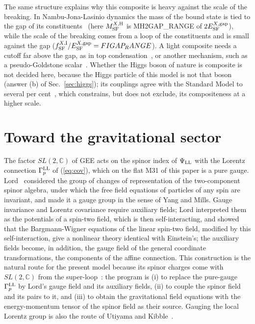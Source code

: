 \documentclass[aps,prd,twocolumn,superscriptaddress,nofootinbib,floatfix,longbibliography]{revtex4-2}
\newcommand{\LL}{{\rm LL}}
\newcommand{\SF}{{\rm SF}}
\begin{document}
The same structure explains why this composite is heavy against the scale of the breaking. In Nambu-Jona-Lasinio
dynamics the mass of the bound state is tied to the gap of its constituents~\cite{NJL1961} (here $M^{X,{\rm H}}_\SF$ is
{{MH2GAP_RANGE}} of $2E^{X,{\rm gap}}_\SF$), while the scale of the breaking comes from a loop of the constituents and is small
against the gap ($f^{X,{\rm I}}_\SF/E^{X,{\rm gap}}_\SF={{FIGAP_RANGE}}$). A light composite needs a cutoff far above the gap, as
in top condensation~\cite{BHL1990,HillSimmons2003}, or another mechanism, such as a pseudo-Goldstone
scalar~\cite{KaplanGeorgi1984,Agashe2005}. Whether the Higgs boson of nature is composite is not decided here, because the
Higgs particle of this model is not that boson (answer (b) of Sec.~\ref{sec:higgs}); its couplings agree with the Standard
Model to several per cent~\cite{ATLAS2022,CMS2022}, which constrains, but does not exclude, its compositeness at a higher
scale.

\section{Toward the gravitational sector}
\label{sec:gravity}

The factor $SL(2,\mathbb C)$ of GEE acts on the spinor index of $\Psi_\LL$ with the Lorentz connection $\Gamma^\LL_p$ of
(\ref{eq:cov}), which on the flat M31 of this paper is a pure gauge. Lord~\cite{Lord1971} considered the group of changes of
representation of the two-component spinor algebra, under which the free field equations of particles of any spin are
invariant, and made it a gauge group in the sense of Yang and Mills. Gauge invariance and Lorentz covariance require
auxiliary fields; Lord interpreted them as the potentials of a spin-two field, which is then self-interacting, and showed
that the Bargmann-Wigner equations of the linear spin-two field, modified by this self-interaction, give a nonlinear theory
identical with Einstein's; the auxiliary fields become, in addition, the gauge field of the general coordinate
transformations, the components of the affine connection. This construction is the natural route for the present model
because its spinor charges come with $SL(2,\mathbb C)$ from the super-loop~\cite{Nash2026}: the program is (i) to replace the
pure-gauge $\Gamma^\LL_p$ by Lord's gauge field and its auxiliary fields, (ii) to couple the spinor field and its pairs to
it, and (iii) to obtain the gravitational field equations with the energy-momentum tensor of the spinor field as their
source. Gauging the local Lorentz group is also the route of Utiyama and Kibble~\cite{Utiyama1956,Kibble1961,Hehl1976}.
\end{document}
